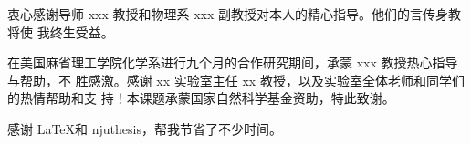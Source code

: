 \begin{acknowledgement}
  衷心感谢导师 xxx 教授和物理系 xxx 副教授对本人的精心指导。他们的言传身教将使
  我终生受益。

  在美国麻省理工学院化学系进行九个月的合作研究期间，承蒙 xxx 教授热心指导与帮助，不
  胜感激。感谢 xx 实验室主任 xx 教授，以及实验室全体老师和同学们的热情帮助和支
  持！本课题承蒙国家自然科学基金资助，特此致谢。

  感谢 \LaTeX 和 njuthesis\cite{njuthesis}，帮我节省了不少时间。
\end{acknowledgement}
